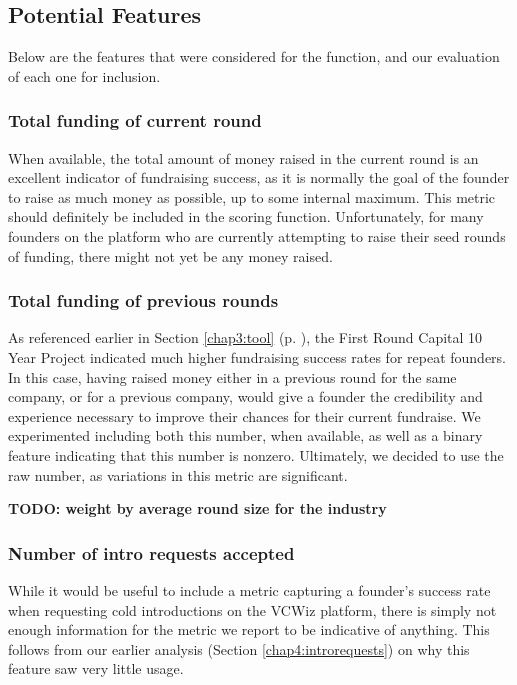 \subsection{Potential Features}

Below are the features that were considered for the function, and our evaluation of each one for inclusion.

\subsubsection{Total funding of current round}

When available, the total amount of money raised in the current round is an excellent indicator of fundraising success, as it is normally the goal of the founder to raise as much money as possible, up to some internal maximum. This metric should definitely be included in the scoring function. Unfortunately, for many founders on the platform who are currently attempting to raise their seed rounds of funding, there might not yet be any money raised.

\subsubsection{Total funding of previous rounds}

As referenced earlier in Section \ref{chap3:tool} (p. \pageref{chap3:tool}), the First Round Capital 10 Year Project \cite{first-round-10-years} indicated much higher fundraising success rates for repeat founders. In this case, having raised money either in a previous round for the same company, or for a previous company, would give a founder the credibility and experience necessary to improve their chances for their current fundraise. We experimented including both this number, when available, as well as a binary feature indicating that this number is nonzero. Ultimately, we decided to use the raw number, as variations in this metric are significant.

\textbf{TODO: weight by average round size for the industry}

\subsubsection{Number of intro requests accepted}

While it would be useful to include a metric capturing a founder's success rate when requesting cold introductions on the VCWiz platform, there is simply not enough information for the metric we report to be indicative of anything. This follows from our earlier analysis (Section \ref{chap4:introrequests}) on why this feature saw very little usage.

